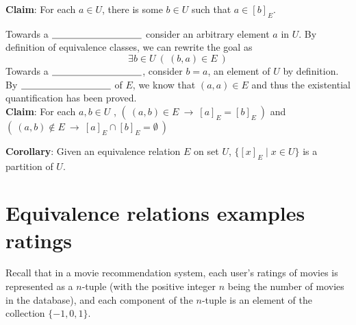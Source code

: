 \documentclass[12pt, oneside]{article}
\begin{document}
{\bf Claim}: For each $a \in U$, there is some $b \in U$  such that $a \in [b]_{E}$.

Towards a $\underline{\phantom{\hspace{1.3in}}}$ 
consider an arbitrary element $a$ in $U$. By definition of equivalence classes, 
we can rewrite the goal as 
$$\exists b \in U ~( ~(b,a) \in E~)$$
Towards a $\underline{\phantom{\hspace{1.3in}}}$, consider $b = a$, 
an element of $U$ by definition. By $\underline{\phantom{\hspace{1.3in}}}$  of $E$, 
we know that $(a,a) \in E$  and thus the existential quantification has been proved. \\
 
{\bf Claim}: For each  $a,b  \in U$ , $(~(a,b)  \in  E ~\to ~ [a]_{E}  = [b]_{E}~)$
and  $(~(a,b)  \notin  E ~\to ~ [a]_{E} \cap[b]_{E} = \emptyset~)$

\phantom{Let $a,b$ be arbitrary. For first goal, assume towards
direct proof that $(a,b) \in E$. To show $[a]_E = [b]_E$ 
first consider arbitrary element $x$ in $[a]_E$. By definition
$(a,x) \in E$ so by symmetry, $(x,a) \in E$ and by 
transitivity with assumption, $(x,b)\in E$. Thus, by definition
of equivalence class, $x \in [b]_E$. Similarly, take arbitrary
element $y \in [b]_E$. By definition $(y,b) \in E$ 
and applying symmetry to assumption, we have $(b,a) \in E$
so by transitivity $(y,a) \in E$ and $y \in[a]_E$, as required
to complete the proof of set equality. For the second goal, 
assume (towards a proof by contrapositive) that $[a]_E \cap [b]_E 
\neq \emptyset$. Then there is a witness $w \in [a]_E \cap [b]_E$.
By definition of equivalence classes $(a,w) \in E$ and $(b,w) \in E$.
By symmetry, we have $(w,b) \in E$ so by transitivity $(a,b) \in E$,
as required.}


\vspace{200pt}

{\bf Corollary}: Given an equivalence relation $E$ on set $U$,  
$\{ [x]_{E} \mid x \in U  \}$ is a partition of $U$.
 \vfill
\section*{Equivalence relations examples ratings}


Recall that 
in a movie recommendation system, each 
user's ratings of movies is represented as a $n$-tuple 
(with the positive integer $n$ 
being the number of movies in the database), 
and each component of 
the $n$-tuple is an element of the collection $\{-1,0,1\}$. 
\end{document}
